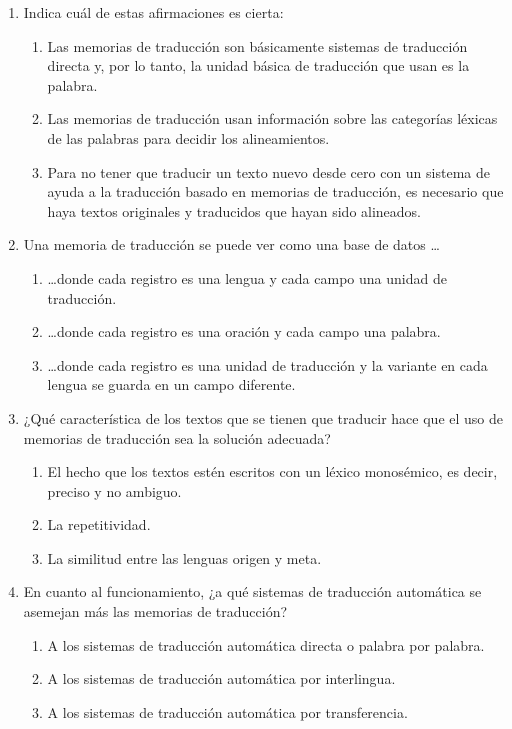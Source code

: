 \begin{enumerate} 

\item Indica cuál de estas afirmaciones es cierta: \begin{enumerate} \item Las memorias de traducción son básicamente sistemas de traducción directa y, por lo tanto, la unidad básica de traducción que usan es la palabra. \item Las memorias de traducción usan información sobre las categorías léxicas de las palabras para decidir los alineamientos. \item Para no tener que traducir un texto nuevo desde cero con un sistema de ayuda a la traducción basado en memorias de traducción, es necesario que haya textos originales y traducidos que hayan sido alineados. \end{enumerate} 

\item Una memoria de traducción se puede ver como una base de datos \ldots

\begin{enumerate} \item \ldots donde cada registro es una lengua y cada campo una unidad de traducción. \item \ldots donde cada registro es una oración y cada campo una palabra. \item \ldots donde cada registro es una unidad de traducción y la variante en cada lengua se guarda en un campo diferente. \end{enumerate} 

\item ¿Qué característica de los textos que se tienen que traducir hace que el uso de memorias de traducción sea la solución adecuada? \begin{enumerate} \item El hecho que los textos estén escritos con un léxico monosémico, es decir, preciso y no ambiguo. \item La repetitividad. \item La similitud entre las lenguas origen y meta. \end{enumerate} 

\item En cuanto al funcionamiento, ¿a qué sistemas de traducción automática se asemejan más las memorias de traducción? \begin{enumerate} \item A los sistemas de traducción automática directa o palabra por palabra. \item A los sistemas de traducción automática por interlingua. \item A los sistemas de traducción automática por transferencia. \end{enumerate} 


\end{enumerate}
